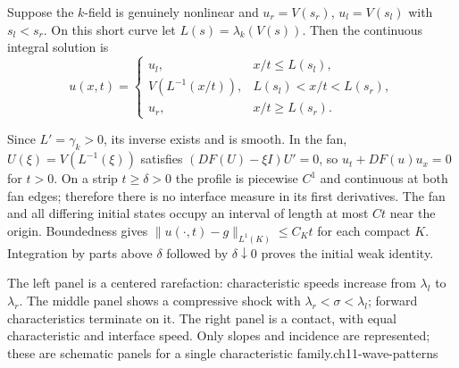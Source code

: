 \begin{theorem}
Suppose the $k$-field is genuinely nonlinear and $u_r=V(s_r)$,
$u_l=V(s_l)$ with $s_l<s_r$. On this short curve let
$L(s)=\lambda_k(V(s))$. Then the continuous integral solution is
\begin{equation}\label{eq:11-fan}
 u(x,t)=\begin{cases}
 u_l,&x/t\le L(s_l),\\
 V(L^{-1}(x/t)),&L(s_l)<x/t<L(s_r),\\
 u_r,&x/t\ge L(s_r).
 \end{cases}
\end{equation}
\end{theorem}
\begin{expandedproof}
Since $L'=\gamma_k>0$, its inverse exists and is smooth. In the fan,
$U(\xi)=V(L^{-1}(\xi))$ satisfies
$(DF(U)-\xi I)U'=0$, so $u_t+DF(u)u_x=0$ for $t>0$.
On a strip $t\ge\delta>0$ the profile is piecewise $C^1$ and continuous
at both fan edges; therefore there is no interface measure in its
first derivatives. The fan and all differing initial states occupy
an interval of length at most $Ct$ near the origin. Boundedness gives
$\|u(\cdot,t)-g\|_{L^1(K)}\le C_Kt$ for each compact $K$.
Integration by parts above $\delta$ followed by $\delta\downarrow0$
proves the initial weak identity.
\end{expandedproof}
{The left panel is a centered rarefaction: characteristic speeds increase
from $\lambda_l$ to $\lambda_r$. The middle panel shows a compressive
shock with $\lambda_r<\sigma<\lambda_l$; forward characteristics terminate
on it. The right panel is a contact, with equal characteristic and interface
speed. Only slopes and incidence are represented; these are schematic
panels for a single characteristic family.}{ch11-wave-patterns}

